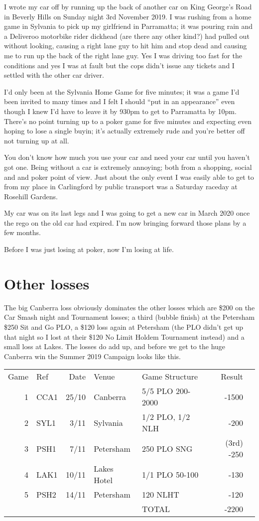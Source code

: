 I wrote my car off by running up the back of another car on King
George's Road in Beverly Hills on Sunday night 3rd November 2019.
I was rushing from a home game in Sylvania to pick up my girlfriend in
Parramatta; it was pouring rain and a Deliveroo motorbike
rider dickhead (are there any other kind?) had pulled out without
looking, causing a right lane guy to hit him and stop dead and causing
me to run up the back of the right lane guy. Yes I was driving too
fast for the conditions and yes I was at fault but the cops didn't
issue any tickets and I settled with the other car driver.

I'd only been at the Sylvania Home Game for five minutes; it was a
game I'd been invited to many times and I felt I should ``put in an
appearance'' even though I knew I'd have to leave it by 930pm to get
to Parramatta by 10pm. There's no point turning up to a poker game for
five minutes and expecting even hoping to lose a single buyin; it's
actually extremely rude and you're better off not turning up at all.

You don't know how much you use your car and need your car until you
haven't got one. Being without a car is extremely annoying; both from
a shopping, social and and poker point of view. Just about the only
event I was easily able to get to from my place in Carlingford by
public transport was a Saturday raceday at Rosehill Gardens.

My car was on its last legs and I was going to get a new car in March
2020 once the rego on the old car had expired. I'm now bringing
forward those plans by a few months.

Before I was just losing at poker, now I'm losing at life.

\section*{Other losses}

The big Canberra loss obviously dominates the other losses which are
\$200 on the Car Smash night and Tournament losses; a third (bubble
finish) at the Petersham \$250 Sit and Go PLO, a \$120 loss again at
Petersham (the PLO didn't get up that night so I lost at their \$120
No Limit Holdem Tournament instead) and a small loss at Lakes. The
losses do add up, and before we get to the huge Canberra win the
Summer 2019 Campaign looks like this.

\begin{tabular}{rlrllrr}
 Game & Ref & Date & Venue & Game Structure & Result \\
  1  &   CCA1    & 25/10 & Canberra & 5/5 PLO 200-2000 & -1500 \\
  2  &   SYL1    &  3/11 & Sylvania & 1/2 PLO, 1/2 NLH &  -200 \\
  3  &   PSH1    &  7/11 & Petersham & 250 PLO SNG & (3rd) -250 \\
  4  &   LAK1    & 10/11 & Lakes Hotel & 1/1 PLO 50-100 &  -130 \\
  5  &   PSH2    & 14/11 & Petersham & 120 NLHT & -120 \\
     &           &       &           & TOTAL & -2200  \\
\end{tabular}

